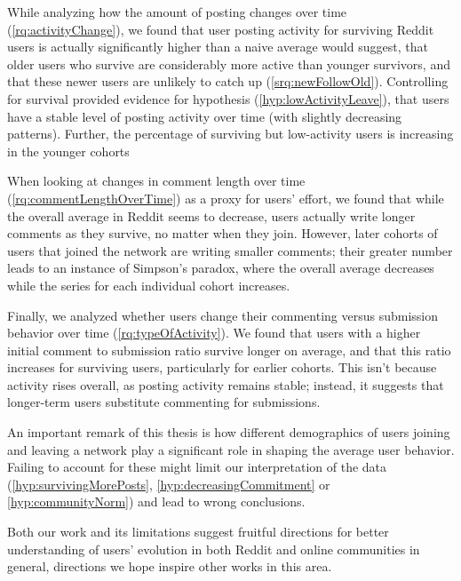 While analyzing how the amount of posting changes over time (\ref{rq:activityChange}), we found that user posting activity for surviving Reddit users is actually significantly higher than a naive average would suggest, that older users who survive are considerably more active than younger survivors, and that these newer users are unlikely to catch up (\ref{srq:newFollowOld}).  Controlling for survival provided evidence for hypothesis (\ref{hyp:lowActivityLeave}), that users have a stable level of posting activity over time (with slightly decreasing patterns).  Further, the percentage of surviving but low-activity users is increasing in the younger cohorts 

When looking at changes in comment length over time (\ref{rq:commentLengthOverTime}) as a proxy for users' effort, we found that while the overall average in Reddit seems to decrease, users actually write longer comments as they survive, no matter when they join.  However, later cohorts of users that joined the network are writing smaller comments; their greater number leads to an instance of Simpson's paradox, where the overall average decreases while the series for each individual cohort increases. 

Finally, we analyzed whether users change their commenting versus submission behavior over time (\ref{rq:typeOfActivity}). 
We found that users with a higher initial comment to submission ratio survive longer on average, and that this ratio increases for surviving users, particularly for earlier cohorts.  This isn't because activity rises overall, as posting activity remains stable; instead, it suggests that longer-term users substitute commenting for submissions. 

An important remark of this thesis is how different demographics of users joining and leaving a network play a significant role in shaping the average user behavior. Failing to account for these might limit our interpretation of the data (\ref{hyp:survivingMorePosts}, \ref{hyp:decreasingCommitment} or \ref{hyp:communityNorm}) and lead to wrong conclusions.

Both our work and its limitations suggest fruitful directions for better understanding of users' evolution in both Reddit and online communities in general, directions we hope inspire other works in this area.  

